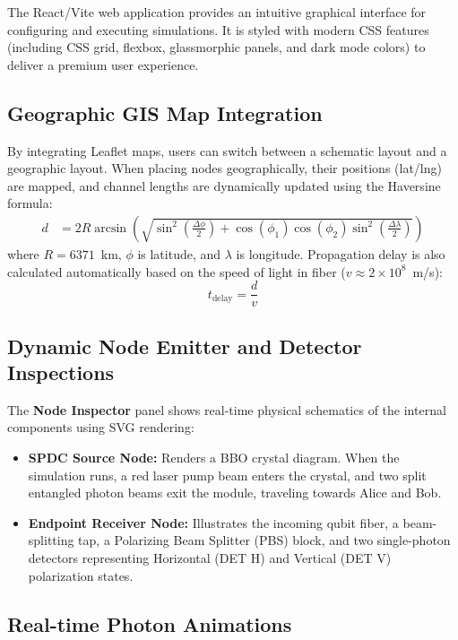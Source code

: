 \documentclass[12pt,oneside,letterpaper,english]{article}
\begin{document}
The React/Vite web application provides an intuitive graphical interface for configuring and executing simulations. It is styled with modern CSS features (including CSS grid, flexbox, glassmorphic panels, and dark mode colors) to deliver a premium user experience.

\subsection{Geographic GIS Map Integration}

By integrating Leaflet maps, users can switch between a schematic layout and a geographic layout. When placing nodes geographically, their positions (lat/lng) are mapped, and channel lengths are dynamically updated using the Haversine formula:
\begin{align}
    d &= 2R \arcsin\left(\sqrt{\sin^2\left(\frac{\Delta \phi}{2}\right) + \cos(\phi_1)\cos(\phi_2)\sin^2\left(\frac{\Delta \lambda}{2}\right)}\right)
\end{align}
where $R = 6371$~km, $\phi$ is latitude, and $\lambda$ is longitude. Propagation delay is also calculated automatically based on the speed of light in fiber ($v \approx 2 \times 10^8$~m/s):
\begin{equation}
    t_{\text{delay}} = \frac{d}{v}
\end{equation}

\subsection{Dynamic Node Emitter and Detector Inspections}

The \textbf{Node Inspector} panel shows real-time physical schematics of the internal components using SVG rendering:
\begin{itemize}
    \item \textbf{SPDC Source Node:} Renders a BBO crystal diagram. When the simulation runs, a red laser pump beam enters the crystal, and two split entangled photon beams exit the module, traveling towards Alice and Bob.
    \item \textbf{Endpoint Receiver Node:} Illustrates the incoming qubit fiber, a beam-splitting tap, a Polarizing Beam Splitter (PBS) block, and two single-photon detectors representing Horizontal (DET H) and Vertical (DET V) polarization states.
\end{itemize}

\subsection{Real-time Photon Animations}
\end{document}
